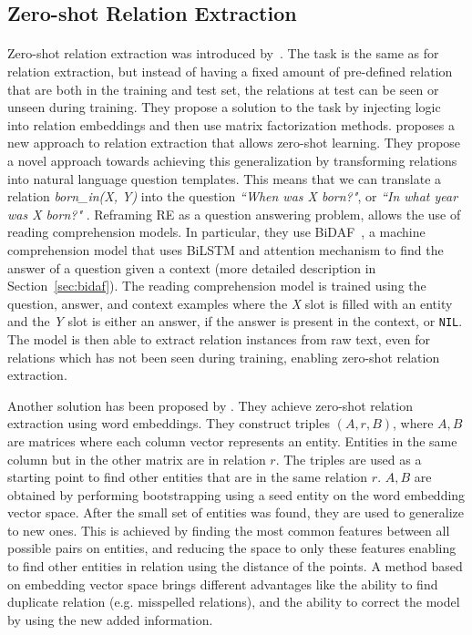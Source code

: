 \subsection{Zero-shot Relation Extraction}
\paragraph{}
Zero-shot relation extraction was introduced by~\cite{rocktaschel2015injecting}. The task is the same as for relation extraction, but instead of having a fixed amount of pre-defined relation that are both in the training and test set, the relations at test can be seen or unseen during training. They propose a solution to the task by injecting logic into relation embeddings and then use matrix factorization methods.
\cite{levy2017zero} proposes a new approach to relation extraction that allows zero-shot learning. They propose a novel approach towards achieving this generalization by transforming relations into natural language question templates. This means that we can translate a relation \textit{born\_in(X, Y)} into the question \textit{``When was X born?"}, or \textit{``In what year was X born?"} . Reframing RE as a question answering problem, allows the use of reading comprehension models. In particular, they use BiDAF~\citep{seo2016bidirectional}, a machine comprehension model that uses BiLSTM and attention mechanism to find the answer of a question given a context (more detailed description in Section~\ref{sec:bidaf}). The reading comprehension model is trained using the question, answer, and context examples where the \textit{X} slot is filled with an entity and the \textit{Y} slot is either an answer, if the answer is present in the context, or \texttt{NIL}. The model is then able to extract relation instances from raw text, even for relations which has not been seen during training, enabling zero-shot relation extraction.

Another solution has been proposed by \cite{goldstein2018zero}. They achieve zero-shot relation extraction using word embeddings. They  construct triples $(A, r, B)$, where $A, B$ are matrices where each column vector represents an entity. Entities in the same column but in the other matrix are in relation $r$. The triples are used as a starting point to find other entities that are in the same relation $r$. $A, B$ are obtained by performing bootstrapping using a seed entity on the word embedding vector space. After the small set of entities was found, they are used to generalize to new ones. This is achieved by finding the most common features between all possible pairs on entities, and reducing the space to only these features enabling to find other entities in relation using the distance of the points. A method based on embedding vector space brings different advantages like the ability to find duplicate relation (e.g. misspelled relations), and the ability to correct the model by using the new added information. 
 

